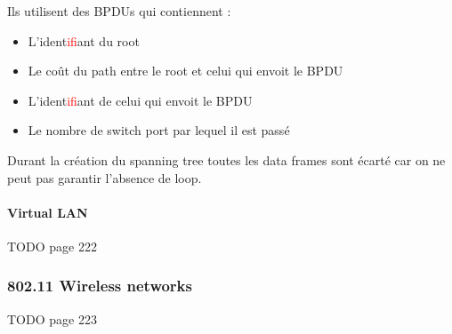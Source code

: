 Ils utilisent des BPDUs qui contiennent :
\begin{itemize}
    \item L'ident\textcolor{red}{if}iant du root
    \item Le coût du path entre le root et celui qui envoit le BPDU
    \item L'ident\textcolor{red}{if}iant de celui qui envoit le BPDU
    \item Le nombre de switch port par lequel il est passé
\end{itemize}


Durant la création du spanning tree toutes les data frames sont écarté
car on ne peut pas garantir l'absence de loop.


\paragraph{Virtual LAN}

TODO page 222

\subsubsection{802.11 Wireless networks}

TODO page 223

\biblio



